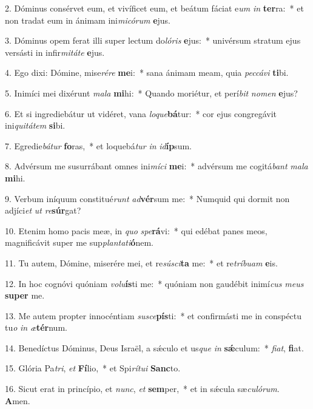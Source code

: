 2. Dóminus consérvet eum, et vivíficet eum, et beátum fáciat e\textit{um} \textit{in} \textbf{ter}ra:~*  et non tradat eum in ánimam ini\textit{mi}\textit{có}\textit{rum} \textbf{e}jus.\

3. Dóminus opem ferat illi super lectum do\textit{ló}\textit{ris} \textbf{e}jus:~*  univérsum stratum ejus versásti in infir\textit{mi}\textit{tá}\textit{te} \textbf{e}jus.\

4. Ego dixi: Dómine, mise\textit{ré}\textit{re} \textbf{me}i:~*  sana ánimam meam, quia \textit{pec}\textit{cá}\textit{vi} \textbf{ti}bi.\

5. Inimíci mei dixérunt \textit{ma}\textit{la} \textbf{mi}hi:~*  Quando moriétur, et perí\textit{bit} \textit{no}\textit{men} \textbf{e}jus?\

6. Et si ingrediebátur ut vidéret, vana \textit{lo}\textit{que}\textbf{bá}tur:~*  cor ejus congregávit ini\textit{qui}\textit{tá}\textit{tem} \textbf{si}bi.\

7. Egredie\textit{bá}\textit{tur} \textbf{fo}ras,~*  et loquebá\textit{tur} \textit{in} \textit{id}\textbf{íp}sum.\

8. Advérsum me susurrábant omnes ini\textit{mí}\textit{ci} \textbf{me}i:~*  advérsum me cogitá\textit{bant} \textit{ma}\textit{la} \textbf{mi}hi.\

9. Verbum iníquum constitué\textit{runt} \textit{ad}\textbf{vér}sum me:~*  Numquid qui dormit non adjíci\textit{et} \textit{ut} \textit{re}\textbf{súr}gat?\

10. Etenim homo pacis meæ, in \textit{quo} \textit{spe}\textbf{rá}vi:~*  qui edébat panes meos, magnificávit super me sup\textit{plan}\textit{ta}\textit{ti}\textbf{ó}nem.\

11. Tu autem, Dómine, miserére mei, et re\textit{sú}\textit{sci}\textbf{ta} me:~*  et re\textit{trí}\textit{bu}\textit{am} \textbf{e}is.\

12. In hoc cognóvi quóniam \textit{vo}\textit{lu}\textbf{ís}ti me:~*  quóniam non gaudébit inimí\textit{cus} \textit{me}\textit{us} \textbf{su}\textbf{per} me.\

13. Me autem propter innocéntiam \textit{su}\textit{sce}\textbf{pís}ti:~*  et confirmásti me in conspéctu tu\textit{o} \textit{in} \textit{æ}\textbf{tér}num.\

14. Benedíctus Dóminus, Deus Israël, a sǽculo et us\textit{que} \textit{in} \textbf{sǽ}culum:~*  \textit{fi}\textit{at}, \textbf{fi}at.\

15. Glória Pa\textit{tri}, \textit{et} \textbf{Fí}lio,~*  et Spi\textit{rí}\textit{tu}\textit{i} \textbf{Sanc}to.\

16. Sicut erat in princípio, et \textit{nunc}, \textit{et} \textbf{sem}per,~*  et in sǽcula sæ\textit{cu}\textit{ló}\textit{rum}. \textbf{A}men.\

